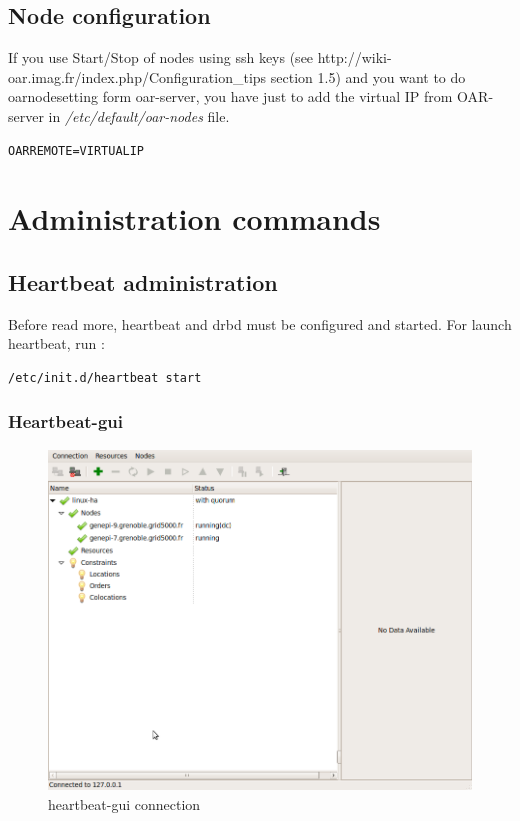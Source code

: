 \documentclass[a4paper,10pt]{report}
\begin{document}
\subsection{Node configuration}
If you use Start/Stop of nodes using ssh keys (see http://wiki-oar.imag.fr/index.php/Configuration\_tips section 1.5) and you want to do oarnodesetting form oar-server, 
you have just to add the virtual IP from OAR-server in \textit{/etc/default/oar-nodes} file.
\begin{lstlisting}
OARREMOTE=VIRTUALIP
\end{lstlisting}

\section{Administration commands}

\subsection{Heartbeat administration}

Before read more, heartbeat and drbd must be configured and started. For launch heartbeat, run :
\begin{lstlisting}
/etc/init.d/heartbeat start
\end{lstlisting}


\subsubsection{Heartbeat-gui}

\begin{figure}
\includegraphics[scale=0.5]{schema/hb_gui-2nodes-connect.png}
\caption{heartbeat-gui connection} 
\label{hb-gui-connect} 
\end{figure}
\end{document}
